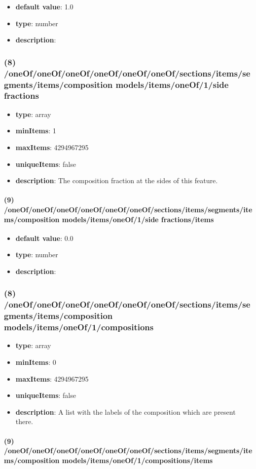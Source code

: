 \begin{itemize}[leftmargin=9em]\item {\bf default value}: 1.0
\item {\bf type}: number
\item {\bf description}: 
\end{itemize}\subsubsection{(8) /oneOf/oneOf/oneOf/oneOf/oneOf/oneOf/sections/items/segments/items/composition models/items/oneOf/1/side fractions}
\begin{itemize}[leftmargin=8em]\item {\bf type}: array
\item {\bf minItems}: 1
\item {\bf maxItems}: 4294967295
\item {\bf uniqueItems}: false
\item {\bf description}: The composition fraction at the sides of this feature.
\end{itemize}\paragraph{(9) /oneOf/oneOf/oneOf/oneOf/oneOf/oneOf/sections/items/segments/items/composition models/items/oneOf/1/side fractions/items}
\begin{itemize}[leftmargin=9em]\item {\bf default value}: 0.0
\item {\bf type}: number
\item {\bf description}: 
\end{itemize}\subsubsection{(8) /oneOf/oneOf/oneOf/oneOf/oneOf/oneOf/sections/items/segments/items/composition models/items/oneOf/1/compositions}
\begin{itemize}[leftmargin=8em]\item {\bf type}: array
\item {\bf minItems}: 0
\item {\bf maxItems}: 4294967295
\item {\bf uniqueItems}: false
\item {\bf description}: A list with the labels of the composition which are present there.
\end{itemize}\paragraph{(9) /oneOf/oneOf/oneOf/oneOf/oneOf/oneOf/sections/items/segments/items/composition models/items/oneOf/1/compositions/items}
